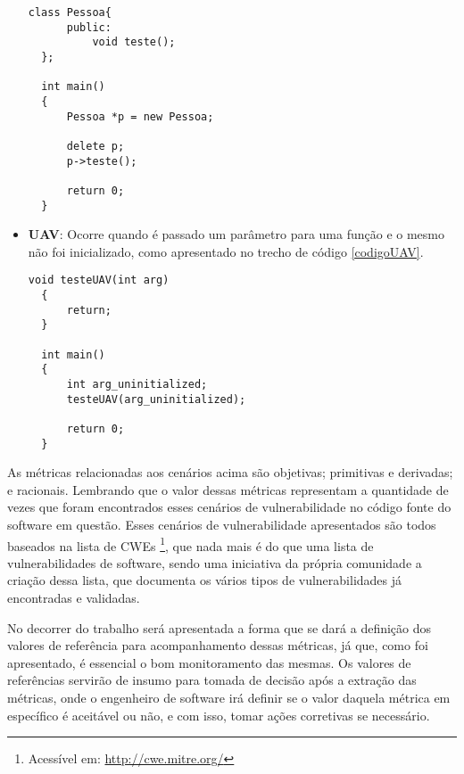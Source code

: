 \begin{itemize}
    \begin{lstlisting}[caption={Código exemplo UAF}, label=codigoUAF]
  class Pessoa{
      public:
          void teste();
  };

  int main()
  {
      Pessoa *p = new Pessoa;

      delete p;
      p->teste();

      return 0;
  }
    \end{lstlisting}
  \item \textbf{UAV}: Ocorre quando é passado um parâmetro para uma função e o mesmo não foi inicializado, como apresentado no 
    trecho de código \ref{codigoUAV}.

    \begin{lstlisting}[caption={Código exemplo UAV}, label=codigoUAV]
  void testeUAV(int arg)
  {
      return;
  }

  int main()
  {
      int arg_uninitialized;
      testeUAV(arg_uninitialized);
      
      return 0;
  }
    \end{lstlisting}
\end{itemize}

As métricas relacionadas aos cenários acima são objetivas; primitivas e derivadas; e racionais. Lembrando que o valor dessas 
métricas representam a quantidade de vezes que foram encontrados esses cenários de vulnerabilidade no código fonte do software 
em questão. Esses cenários de vulnerabilidade apresentados são todos baseados na
lista de CWEs \footnote{Acessível em: \url{http://cwe.mitre.org/}}, que nada
mais é do que uma lista de vulnerabilidades de software, sendo uma iniciativa da
própria comunidade a criação dessa lista, que documenta os vários tipos de
vulnerabilidades já encontradas e validadas.

No decorrer do trabalho será apresentada a forma que se dará a definição dos valores de referência para acompanhamento dessas
métricas, já que, como foi apresentado, é essencial o bom monitoramento das mesmas. Os valores de referências servirão
de insumo para tomada de decisão após a extração das métricas, onde o engenheiro de software irá definir se o valor daquela
métrica em específico é aceitável ou não, e com isso, tomar ações corretivas se necessário.

